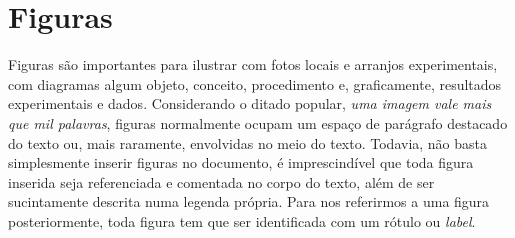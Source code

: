 \section{Figuras}

Figuras são importantes  para ilustrar com fotos locais e arranjos experimentais, com diagramas  algum objeto, conceito, procedimento e, graficamente, resultados experimentais e dados. Considerando o ditado popular, \emph{uma imagem vale mais que mil palavras},  figuras normalmente  ocupam um espaço de parágrafo destacado do texto ou, mais raramente, envolvidas no meio do texto. Todavia, não basta simplesmente inserir figuras no documento, é imprescindível que toda figura inserida seja referenciada e comentada no corpo do texto, além de ser sucintamente descrita numa legenda própria. Para nos referirmos a uma figura posteriormente, toda figura tem que ser identificada com um rótulo ou \emph{label}.
